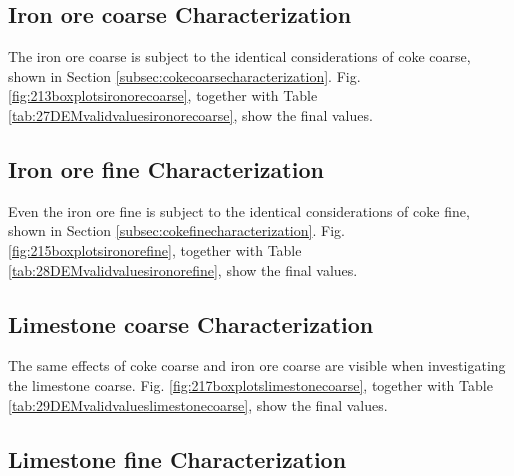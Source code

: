 

%


\subsection{Iron ore coarse Characterization}
\label{subsec:ironorecoarsecharacterization}

The iron ore coarse is subject to the identical considerations of coke coarse,
shown in Section \ref{subsec:cokecoarsecharacterization}.
Fig. \ref{fig:213boxplotsironorecoarse}, together with Table
\ref{tab:27DEMvalidvaluesironorecoarse}, show the final values.



%


\subsection{Iron ore fine Characterization}
\label{subsec:ironorefinecharacterization}

Even the iron ore fine is subject to the identical considerations of coke
fine, shown in Section \ref{subsec:cokefinecharacterization}.
Fig. \ref{fig:215boxplotsironorefine}, together with Table
\ref{tab:28DEMvalidvaluesironorefine}, show the final values.



%


\subsection{Limestone coarse Characterization}
\label{subsec:limestonecoarsecharacterization}

The same effects of coke coarse and iron ore coarse are visible when
investigating the limestone coarse.
Fig. \ref{fig:217boxplotslimestonecoarse}, together with Table
\ref{tab:29DEMvalidvalueslimestonecoarse}, show the final values.



%


\subsection{Limestone fine Characterization}
\label{subsec:limestonefinecharacterization}

